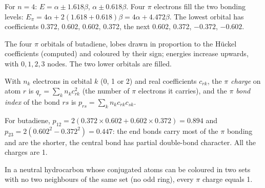 \begin{example}[Butadiene]\label{ex:b2:huckel:butadiene}
For $n = 4$: $E = \alpha \pm 1.618\beta$, $\alpha \pm 0.618\beta$. Four $\pi$ electrons fill the two
bonding levels: $E_\pi = 4\alpha + 2(1.618 + 0.618)\beta = 4\alpha + 4.472\beta$. The lowest
orbital has coefficients 0.372, 0.602, 0.602, 0.372, the next 0.602, 0.372,
$-0.372$, $-0.602$.
\end{example}

\begin{omfigure}

{\small The four $\pi$ orbitals of butadiene, lobes drawn in proportion to the
Hückel coefficients (computed) and coloured by their sign; energies increase
upwards, with $0, 1, 2, 3$ nodes. The two lower orbitals are filled.}
\end{omfigure}

\begin{definition}\label{def:b2:huckel:indices}
With $n_k$ electrons in orbital $k$ (0, 1 or 2) and real coefficients $c_{rk}$, the
\emph{$\pi$ charge} on atom $r$ is $q_r = \sum_k n_kc_{rk}^2$ (the
number of $\pi$ electrons it carries), and the \emph{$\pi$ bond index}
of the bond $rs$ is $p_{rs} = \sum_k n_kc_{rk}c_{sk}$.
\end{definition}

For butadiene, $p_{12} = 2(0.372 \times 0.602 + 0.602 \times 0.372) = 0.894$ and $p_{23} =
2(0.602^2 - 0.372^2) = 0.447$: the end bonds carry most of the $\pi$ bonding and are
the shorter, the central bond has partial double-bond character. All the charges are
1.

\begin{proposition}\label{prop:b2:huckel:alternant}
In a neutral hydrocarbon whose conjugated atoms can be coloured in two sets with
no two neighbours of the same set (no odd ring), every $\pi$ charge equals 1.
\end{proposition}

